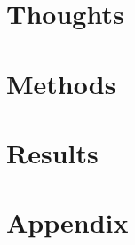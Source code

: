 \frenchspacing
\raggedbottom
{} %
\pagestyle{plain}
%


\cleardoublepage
\pagestyle{scrheadings}
\cleardoublepage
\cleardoublepage\part{Thoughts}



\cleardoublepage\part{Methods}


\cleardoublepage\part{Results}


\appendix
\cleardoublepage\part{Appendix}
%

\cleardoublepage

